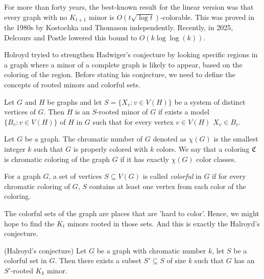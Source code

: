 For more than forty years, the best-known result for the linear version was that every graph with no $K_{t+1}$ minor is $O(t \sqrt{\log t})$-colorable.
This was proved in the 1980s by Kostochka \cite{Kostochka1984} and Thomason \cite{Thomason_1984} independently.
Recently, in 2025, Delcours and Postle \cite{JAMS2025} lowered this bound to $O(k \log \log(k))$.

Holroyd\cite{Holroyd1997} tryied to strengthen Hadwiger’s conjecture by looking specific regions in a graph where a minor of a complete graph is likely to appear, based on the coloring of the region.
Before stating his conjecture, we need to define the concepts of rooted minors and colorful sets.

\begin{defn}
    Let $G$ and $H$ be graphs and let $S = \{X_v : v \in V(H)\}$ be a system of distinct vertices of $G$. Then $H$
    is an $S$-rooted minor of $G$ if exists a model $\{B_v : v \in V(H)\}$ of $H$ in $G$ such that for every
    vertex $v \in V(H)$ $X_v \in B_v$.
\end{defn}

\begin{defn}
    Let $G$ be a graph. The chromatic number of $G$ denoted as $\chi(G)$ is the smallest integer $k$ such that $G$ is 
    properly colored with $k$ colors. We say that a coloring $\mathfrak{C}$ is chromatic coloring of the graph $G$ if 
    it has exactly $\chi(G)$ color classes.
\end{defn}

\begin{defn}
 For a graph $G$, a set of vertices $S \subseteq V(G)$ is called \textit{colorful} in $G$ if for every chromatic coloring of $G$, $S$ contains at least one 
 vertex from each color of the coloring.
\end{defn}

The colorful sets of the graph are places that are 'hard to color'. Hence, we might hope to find the $K_{t}$ minors rooted in those sets. And this is 
exactly the Halroyd's conjecture.

\begin{conj} (Halroyd's conjecture)
 Let $G$ be a graph with chromatic number $k$, let $S$ be a colorful set in $G$. Then there exists
 a subset $S' \subseteq S$ of size $k$ such that $G$ has an $S'$-rooted $K_k$ minor. 
\end{conj}


